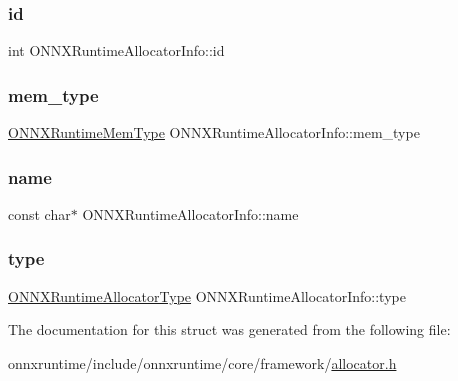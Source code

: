 \subsubsection{\texorpdfstring{id}{id}}
{\footnotesize\ttfamily int O\+N\+N\+X\+Runtime\+Allocator\+Info\+::id}

\mbox{\label{structONNXRuntimeAllocatorInfo_a9268102d6cd957a60f7331aa75ca6c0f}} 
\subsubsection{\texorpdfstring{mem\+\_\+type}{mem\_type}}
{\footnotesize\ttfamily \mbox{\hyperlink{allocator__info_8h_add3f8ee3ff93395704abae71c30cab18}{O\+N\+N\+X\+Runtime\+Mem\+Type}} O\+N\+N\+X\+Runtime\+Allocator\+Info\+::mem\+\_\+type}

\mbox{\label{structONNXRuntimeAllocatorInfo_af5027de8d87f680071513aa6fef2e68d}} 
\subsubsection{\texorpdfstring{name}{name}}
{\footnotesize\ttfamily const char$\ast$ O\+N\+N\+X\+Runtime\+Allocator\+Info\+::name}

\mbox{\label{structONNXRuntimeAllocatorInfo_aa84751276c6e6a68d0dfc5d582c4b90d}} 
\subsubsection{\texorpdfstring{type}{type}}
{\footnotesize\ttfamily \mbox{\hyperlink{allocator__info_8h_a2c2bd010ef8b74c81553f74c5eeb2677}{O\+N\+N\+X\+Runtime\+Allocator\+Type}} O\+N\+N\+X\+Runtime\+Allocator\+Info\+::type}



The documentation for this struct was generated from the following file\+:\begin{DoxyCompactItemize}
\item 
onnxruntime/include/onnxruntime/core/framework/\mbox{\hyperlink{framework_2allocator_8h}{allocator.\+h}}\end{DoxyCompactItemize}
